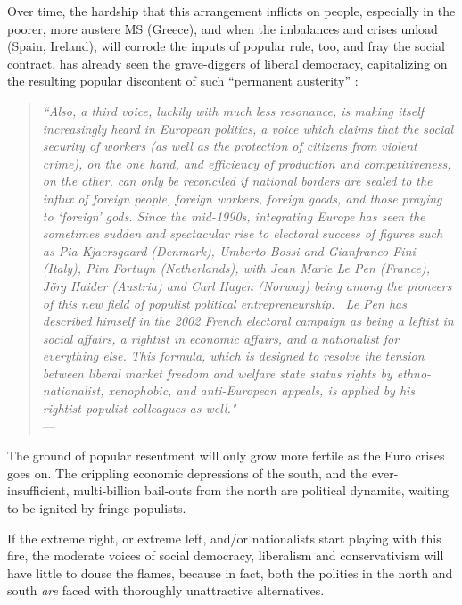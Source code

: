 \documentclass[11pt,a4paper,oneside]{article}
\begin{document}
Over time, the hardship that this arrangement inflicts on people, especially in the poorer, more austere \gls{MS} (Greece), and when the imbalances and crises unload (Spain, Ireland), will corrode the inputs of popular rule, too, and fray the social contract. 
\citeauthor{Offe2003} has already seen the grave-diggers of liberal democracy, capitalizing on the resulting popular discontent of such ``permanent austerity'' \citep{Streeck2010b}: 
\begin{quote}
	\emph{``Also, a third voice, luckily with much less resonance, is making itself increasingly heard in European politics, a voice which claims that the social security of workers (as well as the protection of citizens from violent crime), on the one hand, and efficiency of production and competitiveness, on the other, can only be reconciled if national borders are sealed to the influx of foreign people, foreign workers, foreign goods, and those praying to `foreign' gods. 
	Since the mid-1990s, integrating Europe has seen the sometimes sudden and spectacular rise to electoral success of figures such as Pia Kjaersgaard (Denmark), Umberto Bossi and Gianfranco Fini (Italy), Pim Fortuyn (Netherlands), with Jean Marie Le Pen (France), J\"{o}rg Haider (Austria) and Carl Hagen (Norway) being among the pioneers of this new field of populist political entrepreneurship.~
	Le Pen has described himself in the 2002 French electoral campaign as being a leftist in social affairs, a rightist in economic affairs, and a nationalist for everything else. 
	This formula, which is designed to resolve the tension between liberal market freedom and welfare state status rights by ethno-nationalist, xenophobic, and anti-European appeals, is applied by his rightist populist colleagues as well."}\\
	--- \citep[454]{Offe2003}
\end{quote}

The ground of popular resentment will only grow more fertile as the Euro crises goes on. 
The crippling economic depressions of the south, and the ever-insufficient, multi-billion bail-outs from the north are political dynamite, waiting to be ignited by fringe populists. 


If the extreme right, or extreme left, and/or nationalists start playing with this fire, the moderate voices of social democracy, liberalism and conservativism will have little to douse the flames, because in fact, both the polities in the north and south \emph{are} faced with thoroughly unattractive alternatives.
\end{document}
